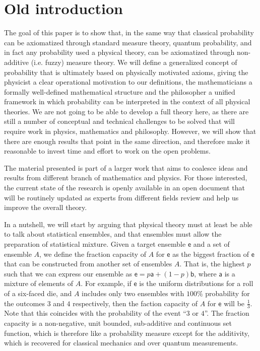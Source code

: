 \documentclass[10pt,twocolumn, nofootinbib]{revtex4-2}
\newcommand{\ens}[1][e] {\mathsf{#1}} %
\begin{document}
\section{Old introduction}

The goal of this paper is to show that, in the same way that classical probability can be axiomatized through standard measure theory, quantum probability, and in fact any probability used a physical theory, can be axiomatized through non-additive (i.e. fuzzy) measure theory. We will define a generalized concept of probability that is ultimately based on physically motivated axioms, giving the physicist a clear operational motivation to our definitions, the mathematicians a formally well-defined mathematical structure and the philosopher a unified framework in which probability can be interpreted in the context of all physical theories. We are not going to be able to develop a full theory here, as there are still a number of conceptual and technical challenges to be solved that will require work in physics, mathematics and philosophy. However, we will show that there are enough results that point in the same direction, and therefore make it reasonable to invest time and effort to work on the open problems.

The material presented is part of a larger work that aims to coalesce ideas and results from different branch of mathematics and physics. For those interested, the current state of the research is openly available in an open document that will be routinely updated as experts from different fields review and help us improve the overall theory.

In a nutshell, we will start by arguing that physical theory must at least be able to talk about statistical ensembles, and that ensembles must allow the preparation of statistical mixture. Given a target ensemble $\ens$ and a set of ensemble $A$, we define the fraction capacity of $A$ for $\ens$ as the biggest fraction of $\ens$ that can be constructed from another set of ensembles $A$. That is, the highest $p$ such that we can express our ensemble as $\ens = p \ens[a] + (1-p) \ens[b]$, where $\ens[a]$ is a mixture of elements of $A$. For example, if $\ens$ is the uniform distributions for a roll of a six-faced die, and $A$ includes only two ensembles with $100\%$ probability for the outcomes $3$ and $4$ respectively, then the faction capacity of $A$ for $\ens$ will be $\frac{1}{3}$. Note that this coincides with the probability of the event ``$3$ or $4$''. The fraction capacity is a non-negative, unit bounded, sub-additive and continuous set function, which is therefore like a probability measure except for the additivity, which is recovered for classical mechanics and over quantum measurements.
\end{document}
